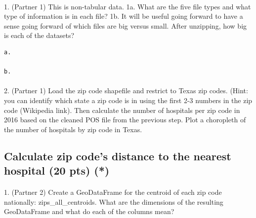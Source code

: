 \documentclass[
  letterpaper,
  DIV=11,
  numbers=noendperiod]{scrartcl}
\makeatletter
\let\oldparagraph\paragraph
\renewcommand{\paragraph}{
    \@ifstar
      \xxxParagraphStar
      \xxxParagraphNoStar
  }
\newcommand{\xxxParagraphStar}[1]{\oldparagraph*{#1}\mbox{}}
\newcommand{\xxxParagraphNoStar}[1]{\oldparagraph{#1}\mbox{}}
\makeatother
\begin{document}
\paragraph{1. (Partner 1) This is non-tabular data. 1a. What are the
five file types and what type of information is in each file? 1b. It
will be useful going forward to have a sense going forward of which
files are big versus small. After unzipping, how big is each of the
datasets?}\label{partner-1-this-is-non-tabular-data.-1a.-what-are-the-five-file-types-and-what-type-of-information-is-in-each-file-1b.-it-will-be-useful-going-forward-to-have-a-sense-going-forward-of-which-files-are-big-versus-small.-after-unzipping-how-big-is-each-of-the-datasets}

\begin{verbatim}
a.

b. 
\end{verbatim}

\paragraph{2. (Partner 1) Load the zip code shapefile and restrict to
Texas zip codes. (Hint: you can identify which state a zip code is in
using the first 2-3 numbers in the zip code (Wikipedia link). Then
calculate the number of hospitals per zip code in 2016 based on the
cleaned POS file from the previous step. Plot a choropleth of the number
of hospitals by zip code in
Texas.}\label{partner-1-load-the-zip-code-shapefile-and-restrict-to-texas-zip-codes.-hint-you-can-identify-which-state-a-zip-code-is-in-using-the-first-2-3-numbers-in-the-zip-code-wikipedia-link.-then-calculate-the-number-of-hospitals-per-zip-code-in-2016-based-on-the-cleaned-pos-file-from-the-previous-step.-plot-a-choropleth-of-the-number-of-hospitals-by-zip-code-in-texas.}

\subsection{Calculate zip code's distance to the nearest hospital (20
pts)
(*)}\label{calculate-zip-codes-distance-to-the-nearest-hospital-20-pts}

\paragraph{1. (Partner 2) Create a GeoDataFrame for the centroid of each
zip code nationally: zips\_all\_centroids. What are the dimensions of
the resulting GeoDataFrame and what do each of the columns
mean?}\label{partner-2-create-a-geodataframe-for-the-centroid-of-each-zip-code-nationally-zips_all_centroids.-what-are-the-dimensions-of-the-resulting-geodataframe-and-what-do-each-of-the-columns-mean}
\end{document}
